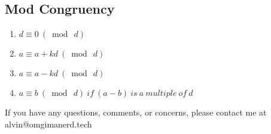 \documentclass[letterpaper, 12pt]{math}
\begin{document}
\subsection*{Mod Congruency}
\begin{enumerate}
  \item \( d\equiv0\ (\bmod\ d) \) \\
  \item \( a\equiv a+kd\ (\bmod\ d) \) \\
  \item \( a\equiv a-kd\ (\bmod\ d) \) \\
  \item \( a\equiv b\ (\bmod\ d)\ if\ (a-b)\ is\ a\ multiple\ of\ d \)
\end{enumerate}

\begin{center}
  If you have any questions, comments, or concerns, please contact me at
  alvin@omgimanerd.tech
\end{center}
\end{document}
